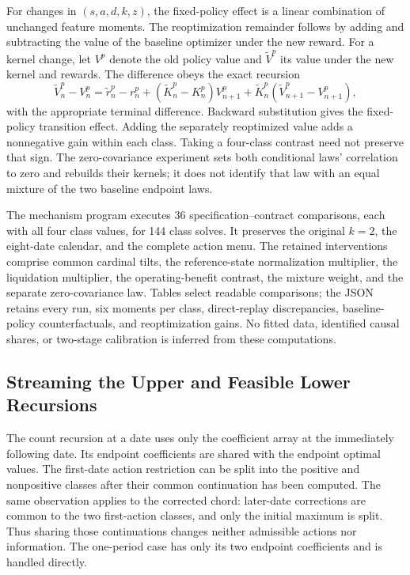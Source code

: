 For changes in $(s,a,d,k,z)$, the fixed-policy effect is a linear combination of unchanged feature moments. The reoptimization remainder follows by adding and subtracting the value of the baseline optimizer under the new reward. For a kernel change, let $V^p$ denote the old policy value and $\widetilde V^p$ its value under the new kernel and rewards. The difference obeys the exact recursion
\[
 \widetilde V_n^p-V_n^p
 =\widetilde r_n^p-r_n^p
 +(\widetilde K_n^p-K_n^p)V_{n+1}^p
 +\widetilde K_n^p(\widetilde V_{n+1}^p-V_{n+1}^p),
\]
with the appropriate terminal difference. Backward substitution gives the fixed-policy transition effect. Adding the separately reoptimized value adds a nonnegative gain within each class. Taking a four-class contrast need not preserve that sign. The zero-covariance experiment sets both conditional laws' correlation to zero and rebuilds their kernels; it does not identify that law with an equal mixture of the two baseline endpoint laws.

The mechanism program executes 36 specification--contract comparisons, each with all four class values, for 144 class solves. It preserves the original $k=2$, the eight-date calendar, and the complete action menu. The retained interventions comprise common cardinal tilts, the reference-state normalization multiplier, the liquidation multiplier, the operating-benefit contrast, the mixture weight, and the separate zero-covariance law. Tables select readable comparisons; the JSON retains every run, six moments per class, direct-replay discrepancies, baseline-policy counterfactuals, and reoptimization gains. No fitted data, identified causal shares, or two-stage calibration is inferred from these computations.

\subsection{Streaming the Upper and Feasible Lower Recursions}
The count recursion at a date uses only the coefficient array at the immediately following date. Its endpoint coefficients are shared with the endpoint optimal values. The first-date action restriction can be split into the positive and nonpositive classes after their common continuation has been computed. The same observation applies to the corrected chord: later-date corrections are common to the two first-action classes, and only the initial maximum is split. Thus sharing those continuations changes neither admissible actions nor information. The one-period case has only its two endpoint coefficients and is handled directly.

